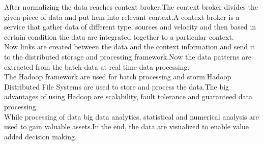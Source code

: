 \documentclass[10pt,a4paper,journal]{IEEEtran}
\begin{document}
\hspace{2em}After normalizing the data  reaches context broker.The context broker divides the given piece of data and put hem into relevant context.A context broker is a service that gather data of different type, sources and velocity and then based in certain condition the data are integrated together to a particular context.\\
\hspace{2em}Now links are created between the data and the context information and send it to the distributed storage and processing framework.Now the data patterns are extracted from the batch data at real time data processing.\\
\hspace{2em}The Hadoop framework are used for batch processing and storm.Hadoop Distributed File Systems are used to store and process the data.The big advantages of using Hadoop are scalability, fault tolerance and guaranteed data processing.\\
\hspace{2em}While processing of data big data analytics, statistical and numerical analysis are used to gain valuable assets.In the end, the data are visualized to enable value added decision making.
  \\
\end{document}
